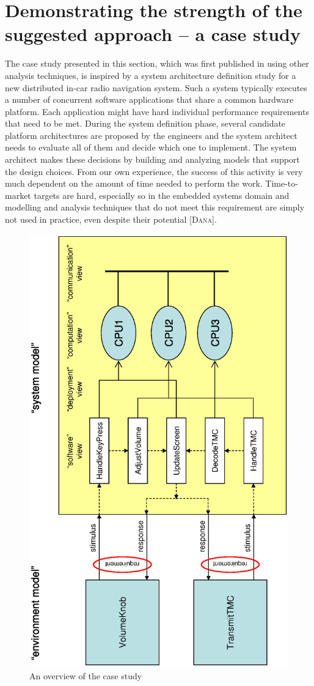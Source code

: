 \section{Demonstrating the strength of the suggested approach -- a case study}
\label{sec:casestudy}

The case study presented in this section, which was first published in
\cite{Wandeler&04} using other analysis techniques, is inspired by a
system architecture definition study for a new distributed in-car radio
navigation system. Such a system typically executes a number of concurrent
software applications that share a common
hardware platform. Each application might have hard individual performance
requirements that need to be met. During the system definition phase, several
candidate platform architectures are proposed by the engineers and the system
architect needs to evaluate all of them and decide which one to implement. The
system architect makes these decisions by building and analyzing models that
support the design choices. From our own experience, the success of this
activity is very much dependent on the amount of time needed to perform the
work. Time-to-market targets are hard, especially so in the embedded systems
domain and modelling and analysis techniques that do not meet this requirement
are simply not used in practice, even despite their potential \textsc{[Dana]}.

\begin{figure}[htb]
\begin{center}
\vspace{-0.8cm}
\includegraphics[width=0.6\columnwidth,angle=-90]{casestudy.eps}
\vspace{-1.5cm}
\caption{An overview of the case study}
\label{fig:casestudy}
\end{center}
\end{figure}

